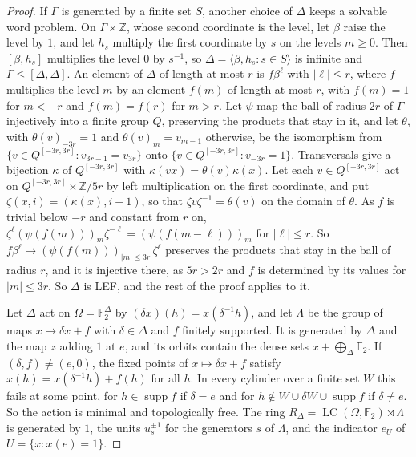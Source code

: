 \documentclass[11pt]{amsart}
\newcommand{\F}{\mathbb F}
\newcommand{\Z}{\mathbb Z}
\newcommand{\LC}{\operatorname{LC}}
\begin{document}
\begin{proof}
If $\Gamma$ is generated by a finite set $S$, another choice of $\Delta$
keeps a solvable word problem. On $\Gamma\times\Z$, whose second
coordinate is the level, let $\beta$ raise the level by $1$, and let $h_s$
multiply the first coordinate by $s$ on the levels $m\ge0$. Then
$[\beta,h_s]$ multiplies the level $0$ by $s^{-1}$, so
$\Delta=\langle\beta,h_s:s\in S\rangle$ is infinite and
$\Gamma\le[\Delta,\Delta]$. An element of $\Delta$ of length at most $r$
is $f\beta^\ell$ with $|\ell|\le r$, where $f$ multiplies the level $m$ by
an element $f(m)$ of length at most $r$, with $f(m)=1$ for $m<-r$ and
$f(m)=f(r)$ for $m>r$. Let $\psi$ map the ball of radius $2r$ of $\Gamma$
injectively into a finite group $Q$, preserving the products that stay in
it, and let $\theta$, with $\theta(v)_{-3r}=1$ and $\theta(v)_m=v_{m-1}$
otherwise, be the isomorphism from $\{v\in Q^{[-3r,3r]}:v_{3r-1}=v_{3r}\}$
onto $\{v\in Q^{[-3r,3r]}:v_{-3r}=1\}$. Transversals give a bijection
$\kappa$ of $Q^{[-3r,3r]}$ with $\kappa(vx)=\theta(v)\kappa(x)$. Let each
$v\in Q^{[-3r,3r]}$ act on $Q^{[-3r,3r]}\times\Z/5r$ by left
multiplication on the first coordinate, and put
$\zeta(x,i)=(\kappa(x),i+1)$, so that $\zeta v\zeta^{-1}=\theta(v)$ on the
domain of $\theta$. As $f$ is trivial below $-r$ and constant from $r$ on,
$\zeta^\ell(\psi(f(m)))_m\zeta^{-\ell}=(\psi(f(m-\ell)))_m$ for
$|\ell|\le r$. So $f\beta^\ell\mapsto(\psi(f(m)))_{|m|\le3r}\,\zeta^\ell$
preserves the products that stay in the ball of radius $r$, and it is
injective there, as $5r>2r$ and $f$ is determined by its values for
$|m|\le3r$. So $\Delta$ is LEF, and the rest of the proof applies to it.

Let $\Delta$ act on $\Omega=\F_2^{\Delta}$ by $(\delta x)(h)=x(\delta^{-1}h)$,
and let $\Lambda$ be the group of maps $x\mapsto\delta x+f$ with
$\delta\in\Delta$ and $f$ finitely supported. It is generated by $\Delta$
and the map $z$ adding $1$ at $e$, and its orbits contain the dense sets
$x+\bigoplus_\Delta\F_2$. If $(\delta,f)\ne(e,0)$, the fixed points of
$x\mapsto\delta x+f$ satisfy $x(h)=x(\delta^{-1}h)+f(h)$ for all $h$. In
every cylinder over a finite set $W$ this fails at some point, for
$h\in\operatorname{supp}f$ if $\delta=e$ and for
$h\notin W\cup\delta W\cup\operatorname{supp}f$ if $\delta\ne e$. So the
action is minimal and topologically free. The ring
$R_\Delta=\LC(\Omega,\F_2)\rtimes\Lambda$ is generated by $1$, the units
$u_s^{\pm1}$ for the generators $s$ of $\Lambda$, and the indicator $e_U$
of $U=\{x:x(e)=1\}$.


\end{proof}
\end{document}
